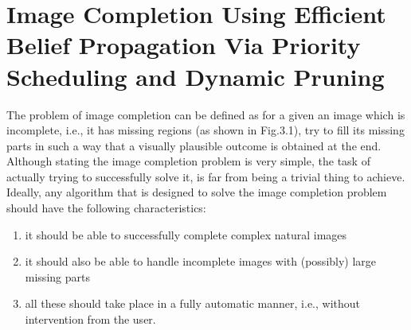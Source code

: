 \section{Image Completion Using Efficient Belief Propagation
Via Priority Scheduling and Dynamic Pruning}
The problem of image completion can be defined as for a given an image which is incomplete, i.e., it has
missing regions (as shown in  Fig.3.1), try to fill its missing parts in such a way that a visually plausible outcome is obtained at
the end. Although stating the image completion problem is very simple, the task of actually trying to successfully solve it, is far from being a trivial thing to achieve. Ideally, any algorithm that is designed to solve the image completion problem should have the following characteristics:
\begin{enumerate}
  \item it should be able to successfully complete complex natural
images
  \item it should also be able to handle incomplete images with
(possibly) large missing parts
  \item all these should take place in a fully automatic manner, i.e.,
without intervention from the user.
\end{enumerate}

